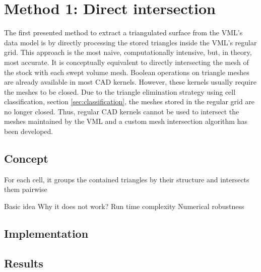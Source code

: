 
\chapter{Method 1: Direct intersection}
\label{ch:direct_intersection}

The first presented method to extract a triangulated surface from the VML's data model is by directly processing the stored triangles inside the VML's regular grid.
This approach is the most naive, computationally intensive, but, in theory, most accurate.
It is conceptually equivalent to directly intersecting the mesh of the stock with each swept volume mesh.
Boolean operations on triangle meshes are already available in most CAD kernels.
However, these kernels usually require the meshes to be closed.
Due to the triangle elimination strategy using cell classification, \cf section \ref{sec:classification}, the meshes stored in the regular grid are no longer closed.
Thus, regular CAD kernels cannot be used to intersect the meshes maintained by the VML and a custom mesh intersection algorithm has been developed.


\section{Concept}
\label{sec:direct_intersection_concept}

For each cell, it groups the contained triangles by their structure and intersects them pairwise

Basic idea
Why it does not work?
Run time complexity
Numerical robustness



\section{Implementation}
\label{sec:direct_intersection_implementation}




\section{Results}
\label{sec:direct_intersection_results}

